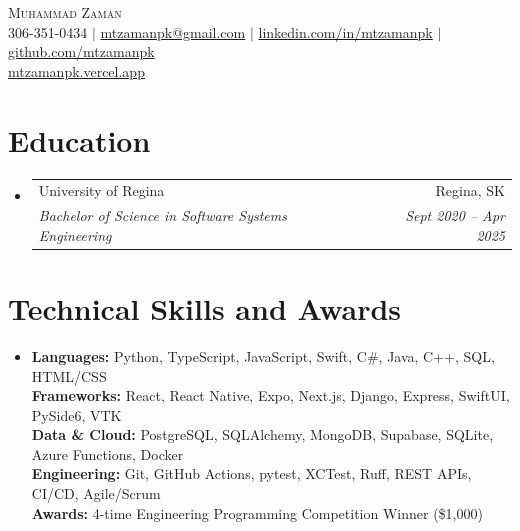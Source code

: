 \documentclass[letterpaper,11pt]{article}
\makeatletter
\newcommand{\resumeSubheading}[4]{%
  \vspace{-2pt}\item
  \begin{tabular*}{0.97\textwidth}[t]{l@{\extracolsep{\fill}}r}
    #1 & #2 \\
    \textit{\small #3} & \textit{\small #4} \\
  \end{tabular*}\vspace{-7pt}}
\newcommand{\resumeSubHeadingListStart}{\begin{itemize}[leftmargin=0.15in, label={}]}
\newcommand{\resumeSubHeadingListEnd}{\end{itemize}}
\makeatother
\begin{document}
\begin{center}
  {\Huge\scshape Muhammad Zaman} \\[2pt]
  \small 306-351-0434 $|$
  \href{mailto:mtzamanpk@gmail.com}{mtzamanpk@gmail.com} $|$
  \href{https://www.linkedin.com/in/mtzamanpk/}{linkedin.com/in/mtzamanpk} $|$
  \href{https://github.com/mtzamanpk}{github.com/mtzamanpk} \\
  \href{https://mtzamanpk.vercel.app/}{mtzamanpk.vercel.app}
\end{center}

\section{Education}
\resumeSubHeadingListStart
  \resumeSubheading
    {University of Regina}{Regina, SK}
    {Bachelor of Science in Software Systems Engineering}{Sept 2020 -- Apr 2025}
\resumeSubHeadingListEnd

\section{Technical Skills and Awards}
\begin{itemize}[leftmargin=0.15in, label={}]
  \small \item {
    \textbf{Languages:} Python, TypeScript, JavaScript, Swift, C\#, Java, C++, SQL, HTML/CSS \\
    \textbf{Frameworks:} React, React Native, Expo, Next.js, Django, Express, SwiftUI, PySide6, VTK \\
    \textbf{Data \& Cloud:} PostgreSQL, SQLAlchemy, MongoDB, Supabase, SQLite, Azure Functions, Docker \\
    \textbf{Engineering:} Git, GitHub Actions, pytest, XCTest, Ruff, REST APIs, CI/CD, Agile/Scrum \\
    \textbf{Awards:} 4-time Engineering Programming Competition Winner (\$1,000)
  }
\end{itemize}
\end{document}
